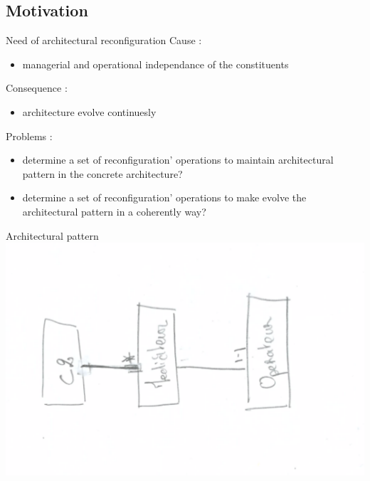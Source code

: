 \documentclass[notes]{beamer}
\begin{document}
\subsection{Motivation}
\begin{frame}{Need of architectural reconfiguration} 
  Cause :
  \begin{itemize}
  \item managerial and operational independance of the constituents
  \end{itemize}
  Consequence :
  \begin{itemize}
  \item architecture evolve continuesly
  \end{itemize}
  Problems :
  \begin{itemize}
  \item determine a set of reconfiguration' operations to maintain architectural pattern in the concrete architecture?
  \item determine a set of reconfiguration' operations to make evolve the architectural pattern in a coherently way?   
  \end{itemize}
\end{frame}

\begin{frame}{Architectural pattern}
  \includegraphics[angle=-90, scale=0.5]{pattern-emergency-service}
\end{frame}
\end{document}
